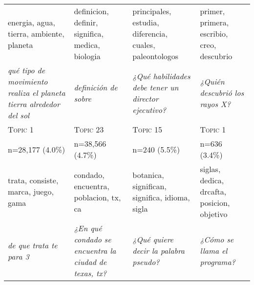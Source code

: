 \begin{tabular}{|>{\centering\arraybackslash}m{3.5cm}|>{\centering\arraybackslash}m{3.5cm}|>{\centering\arraybackslash}m{3.5cm}|>{\centering\arraybackslash}m{3.5cm}|}
    energia, agua, tierra, ambiente, planeta & definicion, definir, significa, medica, biologia & principales, estudia, diferencia, cuales, paleontologos & primer, primera, escribio, creo, descubrio \\
    \textit{qué tipo de movimiento realiza el planeta tierra alrededor del sol} & \textit{definición de sobre} & \textit{¿Qué habilidades debe tener un director ejecutivo?} & \textit{¿Quién descubrió los rayos X?} \\
    \hline
    \textsc{Topic 1} & \textsc{Topic 23} & \textsc{Topic 15} & \textsc{Topic 1} \\
    n=28,177 (4.0\%) & n=38,566 (4.7\%) & n=240 (5.5\%) & n=636 (3.4\%) \\
    trata, consiste, marca, juego, gama & condado, encuentra, poblacion, tx, ca & botanica, significan, significa, idioma, sigla & siglas, dedica, drcafta, posicion, objetivo \\
    \textit{de que trata te para 3} & \textit{¿En qué condado se encuentra la ciudad de texas, tx?} & \textit{¿Qué quiere decir la palabra pseudo?} & \textit{¿Cómo se llama el programa?} \\
    \hline
    
    
\end{tabular}
